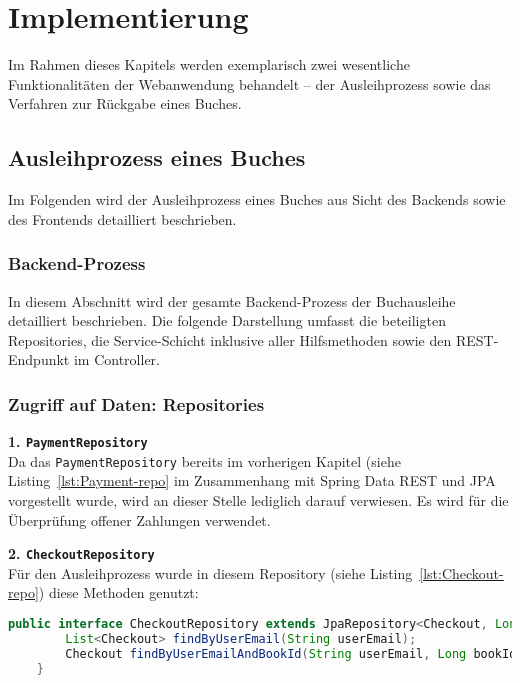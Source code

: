 \chapter{Implementierung}

Im Rahmen dieses Kapitels werden exemplarisch zwei wesentliche Funktionalitäten der Webanwendung behandelt – der Ausleihprozess sowie das Verfahren zur Rückgabe eines Buches. 


\section{Ausleihprozess eines Buches}
Im Folgenden wird der Ausleihprozess eines Buches aus Sicht des Backends sowie des Frontends detailliert beschrieben.

\subsection{Backend-Prozess}
In diesem Abschnitt wird der gesamte Backend-Prozess der Buchausleihe detailliert beschrieben. Die folgende Darstellung umfasst die beteiligten Repositories, die Service-Schicht inklusive aller Hilfsmethoden sowie den REST-Endpunkt im Controller.

\subsection*{Zugriff auf Daten: Repositories}

\textbf{1. \texttt{PaymentRepository}} \\
Da das \texttt{PaymentRepository} bereits im vorherigen Kapitel (siehe Listing~\ref{lst:Payment-repo} im Zusammenhang mit Spring Data REST und JPA vorgestellt wurde, wird an dieser Stelle lediglich darauf verwiesen. Es wird für die Überprüfung offener Zahlungen verwendet.

\noindent \textbf{2. \texttt{CheckoutRepository}} \\
Für den Ausleihprozess wurde in diesem Repository (siehe Listing~\ref{lst:Checkout-repo}) diese Methoden genutzt:
\begin{lstlisting}[language=Java, caption=CheckoutRepository.java, label=lst:Checkout-repo, breaklines=true]
	public interface CheckoutRepository extends JpaRepository<Checkout, Long> {
		List<Checkout> findByUserEmail(String userEmail);
		Checkout findByUserEmailAndBookId(String userEmail, Long bookId);
	}
\end{lstlisting}


